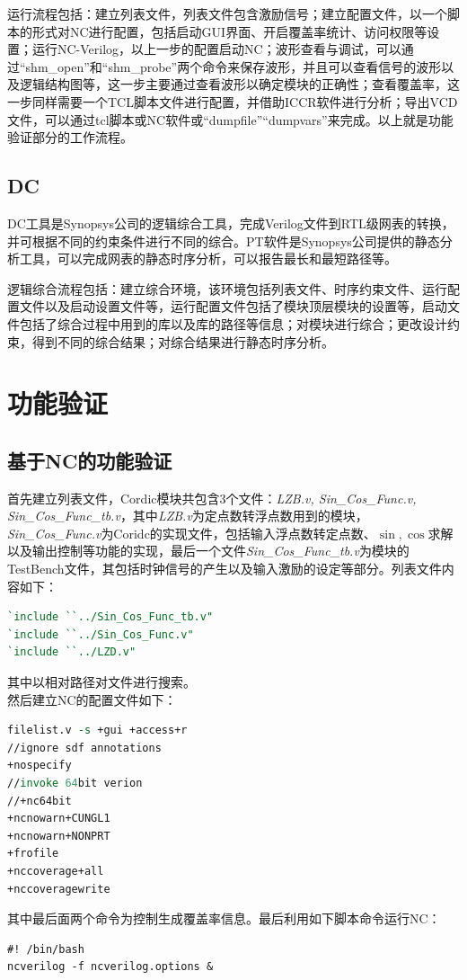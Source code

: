 \documentclass[a4paper,12pt]{report}
\begin{document}
运行流程包括：建立列表文件，列表文件包含激励信号；建立配置文件，以一个脚本的形式对NC进行配置，包括启动GUI界面、开启覆盖率统计、访问权限等设置；运行NC-Verilog，以上一步的配置启动NC；波形查看与调试，可以通过“shm\_open”和“shm\_probe”两个命令来保存波形，并且可以查看信号的波形以及逻辑结构图等，这一步主要通过查看波形以确定模块的正确性；查看覆盖率，这一步同样需要一个TCL脚本文件进行配置，并借助ICCR软件进行分析；导出VCD文件，可以通过tcl脚本或NC软件或“dumpfile”“dumpvars”来完成。以上就是功能验证部分的工作流程。 
\subsection{DC}
DC工具是Synopsys公司的逻辑综合工具，完成Verilog文件到RTL级网表的转换，并可根据不同的约束条件进行不同的综合。PT软件是Synopsys公司提供的静态分析工具，可以完成网表的静态时序分析，可以报告最长和最短路径等。

逻辑综合流程包括：建立综合环境，该环境包括列表文件、时序约束文件、运行配置文件以及启动设置文件等，运行配置文件包括了模块顶层模块的设置等，启动文件包括了综合过程中用到的库以及库的路径等信息；对模块进行综合；更改设计约束，得到不同的综合结果；对综合结果进行静态时序分析。
\section{功能验证}
\subsection{基于NC的功能验证}
首先建立列表文件，Cordic模块共包含3个文件：{\itshape LZB.v, Sin\_Cos\_Func.v, Sin\_Cos\_Func\_tb.v}，其中\textit{LZB.v}为定点数转浮点数用到的模块，\textit{Sin\_Cos\_Func.v}为Coridc的实现文件，包括输入浮点数转定点数、$\sin, \cos$求解以及输出控制等功能的实现，最后一个文件\textit{Sin\_Cos\_Func\_tb.v}为模块的TestBench文件，其包括时钟信号的产生以及输入激励的设定等部分。列表文件内容如下：
\begin{lstlisting}[language=Verilog]
`include ``../Sin_Cos_Func_tb.v"
`include ``../Sin_Cos_Func.v"
`include ``../LZD.v"
\end{lstlisting}
其中以相对路径对文件进行搜索。\\
\indent 然后建立NC的配置文件如下：
{
\footnotesize
\begin{lstlisting}[language=tcl]
filelist.v -s +gui +access+r
//ignore sdf annotations
+nospecify
//invoke 64bit verion
//+nc64bit
+ncnowarn+CUNGL1
+ncnowarn+NONPRT
+frofile
+nccoverage+all
+nccoveragewrite
\end{lstlisting}
}
\noindent 其中最后面两个命令为控制生成覆盖率信息。最后利用如下脚本命令运行NC：\\
\begin{verbatim}
#! /bin/bash
ncverilog -f ncverilog.options &
\end{verbatim}
\end{document}
